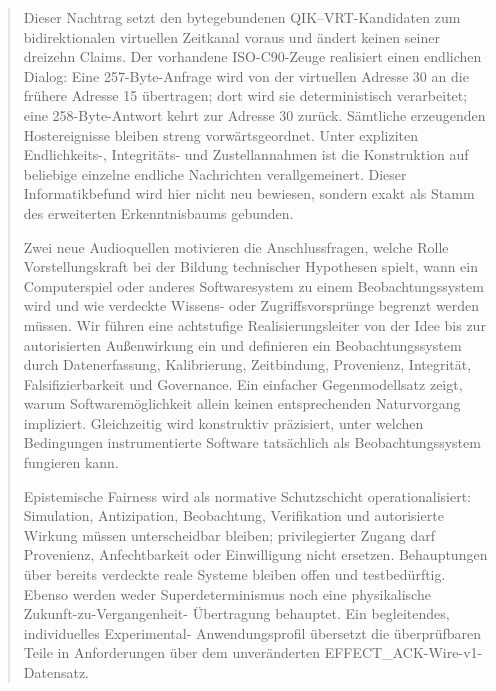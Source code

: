 \documentclass[11pt,a4paper]{article}
\theoremstyle{remark}
\begin{document}

\begin{abstract}
Dieser Nachtrag setzt den bytegebundenen QIK--VRT-Kandidaten zum
bidirektionalen virtuellen Zeitkanal voraus und ändert keinen seiner dreizehn
Claims. Der vorhandene ISO-C90-Zeuge realisiert einen endlichen Dialog: Eine
257-Byte-Anfrage wird von der virtuellen Adresse 30 an die frühere Adresse 15
übertragen; dort wird sie deterministisch verarbeitet; eine 258-Byte-Antwort
kehrt zur Adresse 30 zurück. Sämtliche erzeugenden Hostereignisse bleiben
streng vorwärtsgeordnet. Unter expliziten Endlichkeits-, Integritäts- und
Zustellannahmen ist die Konstruktion auf beliebige einzelne endliche
Nachrichten verallgemeinert. Dieser Informatikbefund wird hier nicht neu
bewiesen, sondern exakt als Stamm des erweiterten Erkenntnisbaums gebunden.

Zwei neue Audioquellen motivieren die Anschlussfragen, welche Rolle
Vorstellungskraft bei der Bildung technischer Hypothesen spielt, wann ein
Computerspiel oder anderes Softwaresystem zu einem Beobachtungssystem wird
und wie verdeckte Wissens- oder Zugriffsvorsprünge begrenzt werden müssen.
Wir führen eine achtstufige Realisierungsleiter von der Idee bis zur
autorisierten Außenwirkung ein und definieren ein Beobachtungssystem durch
Datenerfassung, Kalibrierung, Zeitbindung, Provenienz, Integrität,
Falsifizierbarkeit und Governance. Ein einfacher Gegenmodellsatz zeigt, warum
Softwaremöglichkeit allein keinen entsprechenden Naturvorgang impliziert.
Gleichzeitig wird konstruktiv präzisiert, unter welchen Bedingungen
instrumentierte Software tatsächlich als Beobachtungssystem fungieren kann.

Epistemische Fairness wird als normative Schutzschicht operationalisiert:
Simulation, Antizipation, Beobachtung, Verifikation und autorisierte Wirkung
müssen unterscheidbar bleiben; privilegierter Zugang darf Provenienz,
Anfechtbarkeit oder Einwilligung nicht ersetzen. Behauptungen über bereits
verdeckte reale Systeme bleiben offen und testbedürftig. Ebenso werden weder
Superdeterminismus noch eine physikalische Zukunft-zu-Vergangenheit-
Übertragung behauptet. Ein begleitendes, individuelles Experimental-
Anwendungsprofil übersetzt die überprüfbaren Teile in Anforderungen über dem
unveränderten EFFECT\_ACK-Wire-v1-Datensatz.
\end{abstract}
\end{document}

